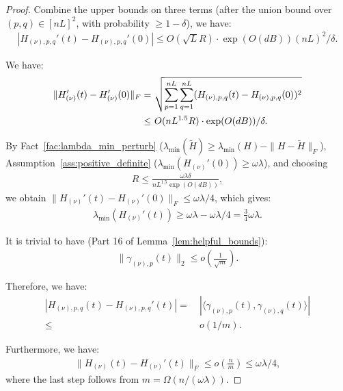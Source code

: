 \documentclass[11pt]{article}
\theoremstyle{plain}
\begin{document}
\begin{proof}
    Combine the upper bounds on three terms (after the union bound over $(p,q)\in[nL]^2$, with probability $\ge 1-\delta$), we have:
    \begin{align*}
        | H_{(\nu), p, q}'(t) - H_{(\nu), p, q}'(0) | \leq  O(\sqrt{L}R) \cdot \exp(O(dB)) (nL)^2/\delta.
    \end{align*}

    We have:
    \begin{align}\label{eq:kernel_perturbation}
        \| H_{(\nu)}'(t) - H_{(\nu)}'(0) \|_F = & ~ \sqrt{\sum_{p=1}^{nL}\sum_{q=1}^{nL} (H_{(\nu), p, q}(t) - H_{(\nu), p, q}(0))^2} \notag \\
        \leq & ~ O(nL^{1.5}R) \cdot \exp(O(dB)) /\delta.
    \end{align}

    By Fact~\ref{fac:lambda_min_perturb} ($\lambda_{\min}(\widetilde H) \geq \lambda_{\min}(H) - \|H-\widetilde H\|_F$), Assumption~\ref{ass:positive_definite} ($\lambda_{\min}(H_{(\nu)}'(0)) \ge \omega\lambda$), and choosing
    \begin{align}\label{eq:bounding_R}
        R \leq \frac{\omega\lambda\delta}{nL^{1.5} \exp(O(dB)) },
    \end{align}
    we obtain $\| H_{(\nu)}'(t) - H_{(\nu)}'(0) \|_F \leq \omega\lambda/4$, which gives:
    \begin{align*}
        \lambda_{\min}(H_{(\nu)}'(t)) \ge \omega\lambda - \omega\lambda/4 = \frac{3}{4} \omega\lambda.
    \end{align*}

    It is trivial to have (Part 16 of Lemma~\ref{lem:helpful_bounds}):
    \begin{align*}
        \| \gamma_{(\nu), p}(t) \|_2 \leq o(\frac{1}{\sqrt{m}}).
    \end{align*}

    Therefore, we have:
    \begin{align*}
        | H_{(\nu), p, q}(t) - H_{(\nu), p, q}'(t) |
        = & ~ | \langle \gamma_{(\nu), p}(t), \gamma_{(\nu), q}(t) \rangle | \\
        \leq & ~ o(1/m).
    \end{align*}

    Furthermore, we have:
    \begin{align*}
        \| H_{(\nu)}(t) - H_{(\nu)}'(t) \|_F \leq o(\frac{n}{m}) \leq \omega\lambda/4,
    \end{align*}
    where the last step follows from $m = \Omega(n/(\omega\lambda))$.


\end{proof}
\end{document}
